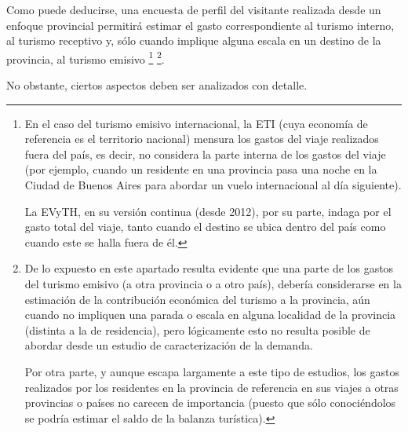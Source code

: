 \documentclass[
]{book}
\begin{document}
Como puede deducirse, una encuesta de perfil del visitante realizada desde un enfoque provincial permitirá estimar el gasto correspondiente al turismo interno, al turismo receptivo y, sólo cuando implique alguna escala en un destino de la provincia, al turismo emisivo \footnote{En el caso del turismo emisivo internacional, la ETI (cuya economía de referencia es el territorio nacional) mensura los gastos del viaje realizados fuera del país, es decir, no considera la parte interna de los gastos del viaje (por ejemplo, cuando un residente en una provincia pasa una noche en la Ciudad de Buenos Aires para abordar un vuelo internacional al día siguiente).

  La EVyTH, en su versión continua (desde 2012), por su parte, indaga por el gasto total del viaje, tanto cuando el destino se ubica dentro del país como cuando este se halla fuera de él.} \footnote{De lo expuesto en este apartado resulta evidente que una parte de los gastos del turismo emisivo (a otra provincia o a otro país), debería considerarse en la estimación de la contribución económica del turismo a la provincia, aún cuando no impliquen una parada o escala en alguna localidad de la provincia (distinta a la de residencia), pero lógicamente esto no resulta posible de abordar desde un estudio de caracterización de la demanda.

  Por otra parte, y aunque escapa largamente a este tipo de estudios, los gastos realizados por los residentes en la provincia de referencia en sus viajes a otras provincias o países no carecen de importancia (puesto que sólo conociéndolos se podría estimar el saldo de la balanza turística).}.

No obstante, ciertos aspectos deben ser analizados con detalle.
\end{document}

